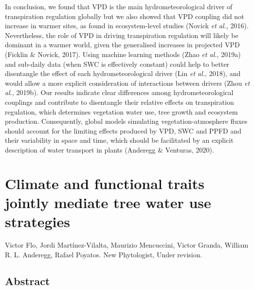 \documentclass[11pt,twoside]{reedthesis}
\begin{document}
In conclusion, we found that VPD is the main hydrometeorological driver
of transpiration regulation globally but we also showed that VPD
coupling did not increase in warmer sites, as found in ecosystem-level
studies (Novick \emph{et al.}, 2016). Nevertheless, the role of VPD in
driving transpiration regulation will likely be dominant in a warmer
world, given the generalised increases in projected VPD (Ficklin \&
Novick, 2017). Using machine learning methods (Zhao \emph{et al.},
2019a) and sub-daily data (when SWC is effectively constant) could help
to better disentangle the effect of each hydrometeorological driver (Lin
\emph{et al.}, 2018), and would allow a more explicit consideration of
interactions between drivers (Zhou \emph{et al.}, 2019b). Our results
indicate clear differences among hydrometeorological couplings and
contribute to disentangle their relative effects on transpiration
regulation, which determines vegetation water use, tree growth and
ecosystem production. Consequently, global models simulating
vegetation-atmosphere fluxes should account for the limiting effects
produced by VPD, SWC and PPFD and their variability in space and time,
which should be facilitated by an explicit description of water
transport in plants (Anderegg \& Venturas, 2020).\par

\newpage

\null\newpage

\chapter[Climate and functional traits mediate tree water use strategies]{Climate and functional traits jointly mediate tree water use strategies}

\setlength{\parindent}{0pt} Victor Flo, Jordi Martínez-Vilalta, Maurizio
Mencuccini, Victor Granda, William R. L. Anderegg, Rafael Poyatos. New
Phytologist, Under revision.

\newpage

\setlength{\parindent}{30pt}

\section*{Abstract}
\end{document}
